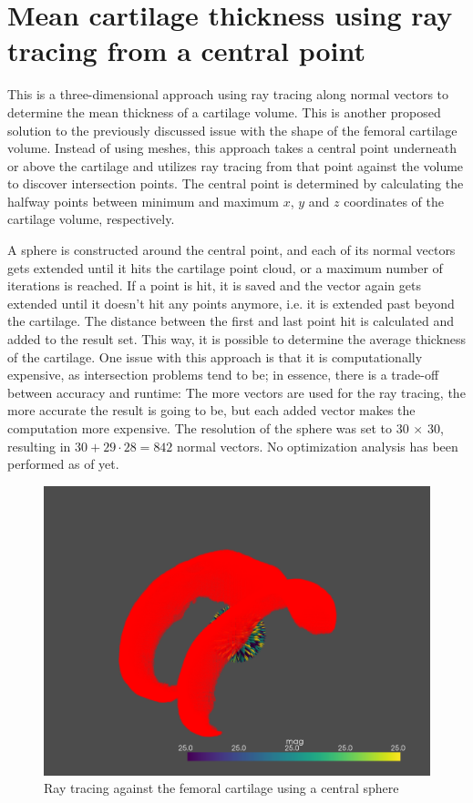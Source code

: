 \section{Mean cartilage thickness using ray tracing from a central point}
\label{sec:Raytracing}
This is a three-dimensional approach using ray tracing along normal vectors to determine the mean thickness of a cartilage volume. This is another proposed solution to the previously discussed issue with the shape of the femoral cartilage volume. Instead of using meshes, this approach takes a central point underneath or above the cartilage and utilizes ray tracing from that point against the volume to discover intersection points. The central point is determined by calculating the halfway points between minimum and maximum $x$, $y$ and $z$ coordinates of the cartilage volume, respectively.
\par
A sphere is constructed around the central point, and each of its normal vectors gets extended until it hits the cartilage point cloud, or a maximum number of iterations is reached. If a point is hit, it is saved and the vector again gets extended until it doesn't hit any points anymore, i.e. it is extended past beyond the cartilage. The distance between the first and last point hit is calculated and added to the result set. This way, it is possible to determine the average thickness of the cartilage. One issue with this approach is that it is computationally expensive, as intersection problems tend to be; in essence, there is a trade-off between accuracy and runtime: The more vectors are used for the ray tracing, the more accurate the result is going to be, but each added vector makes the computation more expensive. The resolution of the sphere was set to 30 $\times$ 30, resulting in $30 + 29 \cdot 28 = 842$ normal vectors. No optimization analysis has been performed as of yet.
\begin{figure}[htb!]
	\centering
	\includegraphics[width=\linewidth]{./figures/s5}
	\caption{Ray tracing against the femoral cartilage using a central sphere}
	\label{fig:femoral_sphere}
\end{figure}

